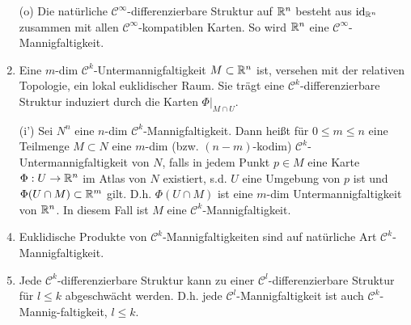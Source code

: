 \begin{example}
\begin{enumerate}
\item[(o)] Die natürliche $\mathcal{C}^\infty$-differenzierbare Struktur auf $\mathbb{R}^n$ besteht aus $\operatorname{id}_{\mathbb{R}^n}$ zusammen mit allen $\mathcal{C}^\infty$-kompatiblen Karten. So wird $\mathbb{R}^n$ eine $\mathcal{C}^\infty$-Mannigfaltigkeit.
\item Eine $m$-dim $\mathcal{C}^k$-Untermannigfaltigkeit $M\subset\mathbb{R}^n$ ist, versehen mit der relativen Topologie, ein lokal euklidischer Raum. Sie trägt eine $\mathcal{C}^k$-differenzierbare Struktur induziert durch die Karten $\Phi|_{M\cap U}$.
\item[(i')] Sei $N^n$ eine $n$-dim $\mathcal{C}^k$-Mannigfaltigkeit. Dann heißt für $0\leq m \leq n$ eine Teilmenge $M\subset N$ eine $m$-dim (bzw. $(n-m)$-kodim) $\mathcal{C}^k$-Untermannigfaltigkeit von $N$, falls in jedem Punkt  $p\in M$ eine Karte $\Phi:U\to \mathbb{R}^n$ im Atlas von $N$ existiert, s.d. $U$ eine Umgebung von $p$ ist und $\Phi(U\cap M)\subset \mathbb{R}^m$ gilt. D.h. $\Phi(U\cap M)$ ist eine $m$-dim Untermannigfaltigkeit von $\mathbb{R}^n$. In diesem Fall ist $M$ eine $\mathcal{C}^k$-Mannigfaltigkeit.
\item Euklidische Produkte von $\mathcal{C}^k$-Mannigfaltigkeiten sind auf natürliche Art $\mathcal{C}^k$-Mannigfaltigkeit.
\item Jede $\mathcal{C}^k$-differenzierbare Struktur kann zu einer $\mathcal{C}^l$-differenzierbare Struktur für $l\leq k$ abgeschwächt werden. D.h. jede $\mathcal{C}^l$-Mannigfaltigkeit ist auch $\mathcal{C}^k$-Mannig-faltigkeit, $l\leq k$.
\end{enumerate}
\end{example}
%

